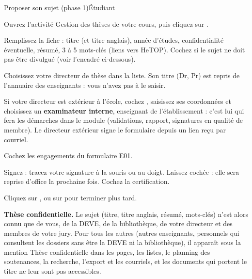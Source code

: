 \documentclass[11pt,a4paper]{article}
\begin{document}
\begin{procedure}{Proposer son sujet (phase 1)}{Étudiant}
\begin{etapes}
  \item Ouvrez l'activité \og Gestion des thèses\fg{} de votre cours, puis
        cliquez sur .
  \item Remplissez la fiche : titre (et titre anglais), année d'études,
        confidentialité éventuelle, résumé, 3 à 5 mots-clés (liens vers HeTOP).
        Cochez  si le sujet ne doit pas être
        divulgué (voir l'encadré ci-dessous).
  \item Choisissez votre directeur de thèse dans la liste. Son titre (Dr, Pr)
        est repris de l'annuaire des enseignants : vous n'avez pas à le saisir.
  \item Si votre directeur est extérieur à l'école, cochez , saisissez ses
        coordonnées et choisissez un \textbf{examinateur interne}, enseignant de
        l'établissement : c'est lui qui fera les démarches dans le module
        (validations, rapport, signatures en qualité de membre). Le directeur
        extérieur signe le formulaire depuis un lien reçu par courriel.
  \item Cochez les engagements du formulaire E01.
  \item Signez : tracez votre signature à la souris ou au doigt. Laissez
        cochée  : elle sera reprise d'office la prochaine fois. Cochez la
        certification.
  \item Cliquez sur , ou sur
         pour terminer plus tard.
\end{etapes}
\end{procedure}

\begin{astuce}
\textbf{Thèse confidentielle.} Le sujet (titre, titre anglais, résumé,
mots-clés) n'est alors connu que de vous, de la DEVE, de la bibliothèque, de
votre directeur et des membres de votre jury. Pour tous les autres (autres
enseignants, personnels qui consultent les dossiers sans être la DEVE ni la
bibliothèque), il apparaît sous la mention \og Thèse confidentielle\fg{} dans
les pages, les listes, le planning des soutenances, la recherche, l'export et
les courriels, et les documents qui portent le titre ne leur sont pas
accessibles.
\end{astuce}
\end{document}
